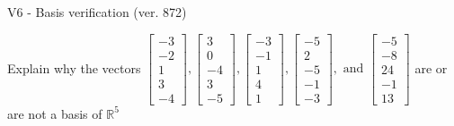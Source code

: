 \begin{exercise}
  \begin{exerciseTitle}V6 - Basis verification (ver. 872)\end{exerciseTitle}
  \begin{exerciseStatement}
    Explain why the vectors \(\left[\begin{array}{r}
-3 \\
-2 \\
1 \\
3 \\
-4
\end{array}\right] , \left[\begin{array}{r}
3 \\
0 \\
-4 \\
3 \\
-5
\end{array}\right] , \left[\begin{array}{r}
-3 \\
-1 \\
1 \\
4 \\
1
\end{array}\right] , \left[\begin{array}{r}
-5 \\
2 \\
-5 \\
-1 \\
-3
\end{array}\right] , \text{ and } \left[\begin{array}{r}
-5 \\
-8 \\
24 \\
-1 \\
13
\end{array}\right]\) are or are not a basis of \(\mathbb{R}^5\)	



\end{exerciseStatement}
\end{exercise}
